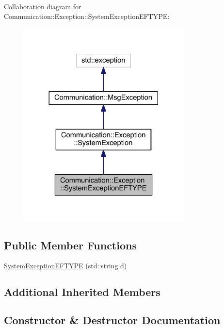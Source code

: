 Collaboration diagram for Communication\+:\+:Exception\+:\+:System\+Exception\+E\+F\+T\+Y\+P\+E\+:\nopagebreak
\begin{figure}[H]
\begin{center}
\leavevmode
\includegraphics[width=248pt]{class_communication_1_1_exception_1_1_system_exception_e_f_t_y_p_e__coll__graph}
\end{center}
\end{figure}
\subsection*{Public Member Functions}
\begin{DoxyCompactItemize}
\item 
\hyperlink{class_communication_1_1_exception_1_1_system_exception_e_f_t_y_p_e_a6cc013ad13aecb7f6672f9bb54f02fcb}{System\+Exception\+E\+F\+T\+Y\+P\+E} (std\+::string d)
\end{DoxyCompactItemize}
\subsection*{Additional Inherited Members}


\subsection{Constructor \& Destructor Documentation}
\hypertarget{class_communication_1_1_exception_1_1_system_exception_e_f_t_y_p_e_a6cc013ad13aecb7f6672f9bb54f02fcb}{}
